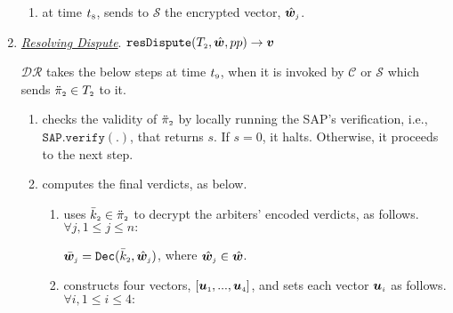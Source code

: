 \begin{enumerate}
\begin{enumerate}
\item at time $t_{\scriptscriptstyle 8}$, sends to $\mathcal S$ the encrypted vector, $\hat {\bm w}_{\scriptscriptstyle j}$. %
\end{enumerate}



\item\label{DR::DisputeResolution}  \underline{\textit{Resolving Dispute}}. $\mathtt{resDispute}(T_{\scriptscriptstyle 2}, \hat {\bm w}, pp)\rightarrow \bm v$



 $\mathcal{DR}$ takes the below steps at time $t_{\scriptscriptstyle 9}$, when it is invoked by $\mathcal{C}$ or  $\mathcal{S}$ which sends $\ddot\pi_{\scriptscriptstyle 2}\in T_{\scriptscriptstyle 2}$ to it.

\begin{enumerate}
%
\item checks the validity of $\ddot{\pi}_{\scriptscriptstyle 2}$ by locally running  the SAP's verification, i.e., $\mathtt{SAP.verify}(.)$, that  returns  $s$. If $s=0$, it halts. Otherwise, it proceeds to the next step. 
%
%
%

\item computes the final verdicts, as below. 
%
\begin{enumerate}
%
\item uses $\bar k_{\scriptscriptstyle 2}\in \ddot \pi_{\scriptscriptstyle 2}$ to decrypt the arbiters' encoded verdicts, as follows. $ \forall j, 1\leq j \leq n:$

$ \bar {\bm w}_{\scriptscriptstyle j}= \mathtt{Dec}(\bar k_{\scriptscriptstyle 2}, \hat{\bm w}_{\scriptscriptstyle j})$, where $\hat{\bm w}_{\scriptscriptstyle j}\in \hat{\bm w}$.
 \item constructs four vectors, $[\bm u_{\scriptscriptstyle 1},...,\bm u_{\scriptscriptstyle 4}]$, and sets  each vector $\bm u_{\scriptscriptstyle i}$ as follows. $\forall i, 1\leq i \leq 4:$
 

\end{enumerate}
\end{enumerate}
\end{enumerate}
